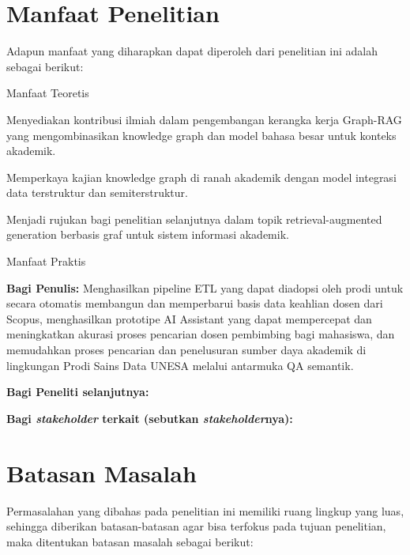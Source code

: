 \section{Manfaat Penelitian}

Adapun manfaat yang diharapkan dapat diperoleh dari penelitian ini adalah sebagai berikut:

\begin{daftar}
	\item Manfaat Teoretis
	\begin{daftar}
		\item Menyediakan kontribusi ilmiah dalam pengembangan kerangka kerja Graph-RAG yang mengombinasikan knowledge graph dan model bahasa besar untuk konteks akademik.
		\item Memperkaya kajian knowledge graph di ranah akademik dengan model integrasi data terstruktur dan semiterstruktur.
		\item Menjadi rujukan bagi penelitian selanjutnya dalam topik retrieval-augmented generation berbasis graf untuk sistem informasi akademik.
	\end{daftar}
	\item Manfaat Praktis
	\begin{daftar}
		\item \textbf{Bagi Penulis:} Menghasilkan pipeline ETL yang dapat diadopsi oleh prodi untuk secara otomatis membangun dan memperbarui basis data keahlian dosen dari Scopus, menghasilkan prototipe AI Assistant yang dapat mempercepat dan meningkatkan akurasi proses pencarian dosen pembimbing bagi mahasiswa, dan memudahkan proses pencarian dan penelusuran sumber daya akademik di lingkungan Prodi Sains Data UNESA melalui antarmuka QA semantik.
		\item \textbf{Bagi Peneliti selanjutnya:}
		\item \textbf{Bagi \textit{stakeholder} terkait (sebutkan \textit{stakeholder}nya):}
	\end{daftar}
\end{daftar}

\section{Batasan Masalah}

Permasalahan yang dibahas pada penelitian ini memiliki ruang lingkup yang luas, sehingga diberikan batasan-batasan agar bisa terfokus pada tujuan penelitian, maka ditentukan batasan masalah sebagai berikut:

